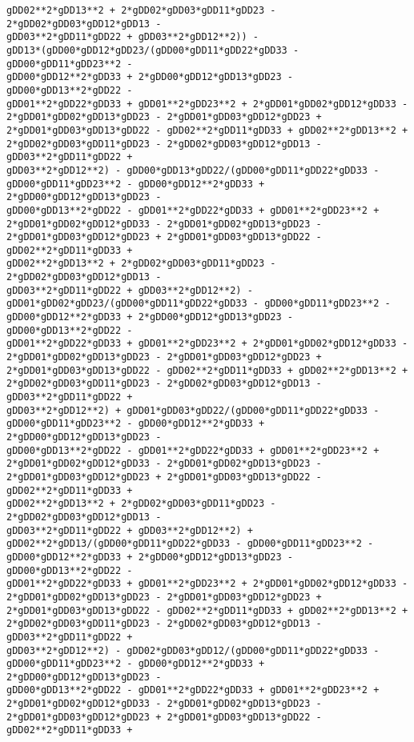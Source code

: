 \documentclass[landscape,letterpaper,10pt,english]{article}
\begin{document}
\begin{Verbatim}[commandchars=\\\{\}]
gDD02**2*gDD13**2 + 2*gDD02*gDD03*gDD11*gDD23 - 2*gDD02*gDD03*gDD12*gDD13 -
gDD03**2*gDD11*gDD22 + gDD03**2*gDD12**2)) -
gDD13*(gDD00*gDD12*gDD23/(gDD00*gDD11*gDD22*gDD33 - gDD00*gDD11*gDD23**2 -
gDD00*gDD12**2*gDD33 + 2*gDD00*gDD12*gDD13*gDD23 - gDD00*gDD13**2*gDD22 -
gDD01**2*gDD22*gDD33 + gDD01**2*gDD23**2 + 2*gDD01*gDD02*gDD12*gDD33 -
2*gDD01*gDD02*gDD13*gDD23 - 2*gDD01*gDD03*gDD12*gDD23 +
2*gDD01*gDD03*gDD13*gDD22 - gDD02**2*gDD11*gDD33 + gDD02**2*gDD13**2 +
2*gDD02*gDD03*gDD11*gDD23 - 2*gDD02*gDD03*gDD12*gDD13 - gDD03**2*gDD11*gDD22 +
gDD03**2*gDD12**2) - gDD00*gDD13*gDD22/(gDD00*gDD11*gDD22*gDD33 -
gDD00*gDD11*gDD23**2 - gDD00*gDD12**2*gDD33 + 2*gDD00*gDD12*gDD13*gDD23 -
gDD00*gDD13**2*gDD22 - gDD01**2*gDD22*gDD33 + gDD01**2*gDD23**2 +
2*gDD01*gDD02*gDD12*gDD33 - 2*gDD01*gDD02*gDD13*gDD23 -
2*gDD01*gDD03*gDD12*gDD23 + 2*gDD01*gDD03*gDD13*gDD22 - gDD02**2*gDD11*gDD33 +
gDD02**2*gDD13**2 + 2*gDD02*gDD03*gDD11*gDD23 - 2*gDD02*gDD03*gDD12*gDD13 -
gDD03**2*gDD11*gDD22 + gDD03**2*gDD12**2) -
gDD01*gDD02*gDD23/(gDD00*gDD11*gDD22*gDD33 - gDD00*gDD11*gDD23**2 -
gDD00*gDD12**2*gDD33 + 2*gDD00*gDD12*gDD13*gDD23 - gDD00*gDD13**2*gDD22 -
gDD01**2*gDD22*gDD33 + gDD01**2*gDD23**2 + 2*gDD01*gDD02*gDD12*gDD33 -
2*gDD01*gDD02*gDD13*gDD23 - 2*gDD01*gDD03*gDD12*gDD23 +
2*gDD01*gDD03*gDD13*gDD22 - gDD02**2*gDD11*gDD33 + gDD02**2*gDD13**2 +
2*gDD02*gDD03*gDD11*gDD23 - 2*gDD02*gDD03*gDD12*gDD13 - gDD03**2*gDD11*gDD22 +
gDD03**2*gDD12**2) + gDD01*gDD03*gDD22/(gDD00*gDD11*gDD22*gDD33 -
gDD00*gDD11*gDD23**2 - gDD00*gDD12**2*gDD33 + 2*gDD00*gDD12*gDD13*gDD23 -
gDD00*gDD13**2*gDD22 - gDD01**2*gDD22*gDD33 + gDD01**2*gDD23**2 +
2*gDD01*gDD02*gDD12*gDD33 - 2*gDD01*gDD02*gDD13*gDD23 -
2*gDD01*gDD03*gDD12*gDD23 + 2*gDD01*gDD03*gDD13*gDD22 - gDD02**2*gDD11*gDD33 +
gDD02**2*gDD13**2 + 2*gDD02*gDD03*gDD11*gDD23 - 2*gDD02*gDD03*gDD12*gDD13 -
gDD03**2*gDD11*gDD22 + gDD03**2*gDD12**2) +
gDD02**2*gDD13/(gDD00*gDD11*gDD22*gDD33 - gDD00*gDD11*gDD23**2 -
gDD00*gDD12**2*gDD33 + 2*gDD00*gDD12*gDD13*gDD23 - gDD00*gDD13**2*gDD22 -
gDD01**2*gDD22*gDD33 + gDD01**2*gDD23**2 + 2*gDD01*gDD02*gDD12*gDD33 -
2*gDD01*gDD02*gDD13*gDD23 - 2*gDD01*gDD03*gDD12*gDD23 +
2*gDD01*gDD03*gDD13*gDD22 - gDD02**2*gDD11*gDD33 + gDD02**2*gDD13**2 +
2*gDD02*gDD03*gDD11*gDD23 - 2*gDD02*gDD03*gDD12*gDD13 - gDD03**2*gDD11*gDD22 +
gDD03**2*gDD12**2) - gDD02*gDD03*gDD12/(gDD00*gDD11*gDD22*gDD33 -
gDD00*gDD11*gDD23**2 - gDD00*gDD12**2*gDD33 + 2*gDD00*gDD12*gDD13*gDD23 -
gDD00*gDD13**2*gDD22 - gDD01**2*gDD22*gDD33 + gDD01**2*gDD23**2 +
2*gDD01*gDD02*gDD12*gDD33 - 2*gDD01*gDD02*gDD13*gDD23 -
2*gDD01*gDD03*gDD12*gDD23 + 2*gDD01*gDD03*gDD13*gDD22 - gDD02**2*gDD11*gDD33 +

\end{Verbatim}
\end{document}
